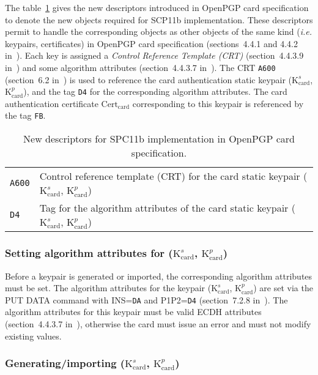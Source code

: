 \documentclass[dvipdfmx,11pt,a4paper,english,final]{article}
\newcommand{\ie}[0]{\textit{i.e.}\xspace}
\newcommand{\cardks}[0]{\ensuremath{\mathrm{K}_\mathrm{card}^s}\xspace}
\newcommand{\cardkp}[0]{\ensuremath{\mathrm{K}_\mathrm{card}^p}\xspace}
\newcommand{\cardcert}[0]{\ensuremath{\mathrm{Cert}_\mathrm{card}}\xspace}
\newcommand{\code}[1]{\texttt{#1}\xspace}
\begin{document}
The table~\ref{tab:scp11:descriptors} gives the new descriptors
introduced in OpenPGP card specification to denote the new objects
required for SCP11b implementation. These descriptors permit to handle
the corresponding objects as other objects of the same kind (\ie
keypairs, certificates) in OpenPGP card specification (sections~4.4.1
and 4.4.2 in~\cite{openpgp-card}). Each key is assigned a
\emph{Control Reference Template (CRT)} (section~4.4.3.9
in~\cite{openpgp-card}) and some algorithm attributes (section~4.4.3.7
in~\cite{openpgp-card}). The CRT \code{A600} (section~6.2
in~\cite{gp-scp11}) is used to reference the card authentication
static keypair (\cardks, \cardkp), and the tag \code{D4} for the
corresponding algorithm attributes. The card authentication
certificate \cardcert corresponding to this keypair is referenced by
the tag \code{FB}.

\begin{table}[ht]
  \centering
  \begin{tabular}{|l|l|}
    \hline
    \code{A600}&Control reference template (CRT) for the card static keypair (\cardks, \cardkp)\\
    \code{D4}&Tag for the algorithm attributes of the card static keypair (\cardks, \cardkp)\\
    \hline
  \end{tabular}
  \caption{New descriptors for SPC11b implementation in OpenPGP card specification.}
  \label{tab:scp11:descriptors}
\end{table}



\subsubsection{Setting algorithm attributes for (\cardks, \cardkp)}

Before a keypair is generated or imported, the corresponding algorithm
attributes must be set. The algorithm attributes for the keypair
(\cardks, \cardkp) are set via the PUT DATA command with INS=\code{DA} and
P1P2=\code{D4} (section~7.2.8 in~\cite{openpgp-card}). The algorithm attributes for this
keypair must be valid ECDH attributes (section~4.4.3.7 in~\cite{openpgp-card}),
otherwise the card must issue an error and must not modify existing
values.

\subsubsection{Generating/importing (\cardks, \cardkp)}
\end{document}
